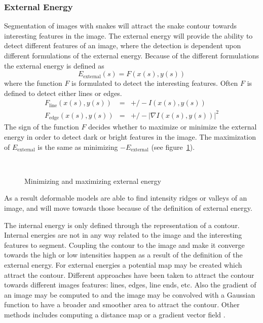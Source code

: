 \subsubsection{External Energy}
\label{sec:external-energy}

Segmentation of images with snakes will attract the snake contour
towards interesting features in the image. The external energy will
provide the ability to detect different features of an image, where
the detection is dependent upon different formulations of the external
energy. Because of the different formulations the external energy is
defined as
\begin{equation}
  \label{eq:snake-energy-external}
  E_{\text{external}}(s) = F(x(s),y(s))
\end{equation}
where the function $F$ is formulated to detect the interesting
features. Often $F$ is defined to detect either lines or edges.
\begin{eqnarray*}
  \label{eq:snake-energy-external-lines}
  F_{\text{line}}(x(s),y(s)) &=& +/- I(x(s),y(s)) \\
  \label{eq:snake-energy-external-edges}
  F_{\text{edge}}(x(s),y(s)) &=& +/- \lvert\nabla I(x(s),y(s))\rvert^{2}
\end{eqnarray*}
The sign of the function $F$ decides whether to maximize or minimize
the external energy in order to detect dark or bright features in the
image. The maximization of $E_{\text{external}}$ is the same as
minimizing $-E_{\text{external}}$ (see
figure~\ref{fig:external-energy-sign}).
\begin{figure}[htbp]
  \centering
  \mbox{%
    \quad%
    }
  \caption{Minimizing and maximizing external energy}
  \label{fig:external-energy-sign}
\end{figure}
As a result deformable models are able to find intensity ridges or
valleys of an image, and will move towards those because of the
definition of external energy.

The internal energy is only defined through the representation of a
contour. Internal energies are not in any way related to the image and
the interesting features to segment. Coupling the contour to the image
and make it converge towards the high or low intensities happen
as a result of the definition of the external energy. For external
energies a potential map may be created which attract the
contour. Different approaches have been taken to attract the contour
towards different images features: lines, edges, line ends, etc. Also
the gradient of an image may be computed to and the image may be
convolved with a Gaussian function to have a broader and smoother area
to attract the contour. Other methods includes computing a distance
map or a gradient vector field \citep{xu97a,xu97b}.

